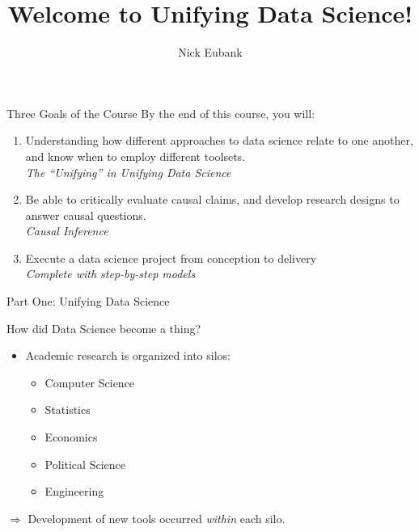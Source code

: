 \documentclass[11pt]{beamer}
\title{Welcome to Unifying Data Science!}
\author{\small Nick Eubank}
\date{\vspace*{.3in} \date}
\begin{document}
\begin{frame}[c]
\maketitle
\end{frame}

\begin{frame}[c]{Three Goals of the Course}
By the end of this course, you will:
  \begin{enumerate}
    \pause \item Understanding how different approaches to data science relate to one another, and know when to employ different toolsets. \\
  \emph{The ``Unifying'' in Unifying Data Science}  
    \pause \item Be able to critically evaluate causal claims, and develop research designs to answer causal questions.  \\
  \emph{Causal Inference}
  \pause \item Execute a data science project from conception to delivery \\
  \emph{Complete with step-by-step models}
\end{enumerate}
\end{frame}



\begin{frame}[c]{}
  \centering 
  Part One: Unifying Data Science
\end{frame}

\begin{frame}[c]{How did Data Science become a thing?}

\begin{itemize}
    \pause \item Academic research is organized into silos:
    \pause
    \begin{itemize}
        \item Computer Science
        \item Statistics
        \item Economics
        \item Political Science
        \item Engineering
    \end{itemize}
\end{itemize}
\pause $\Rightarrow$ Development of new tools occurred \emph{within} each silo.
\end{frame}
\end{document}
